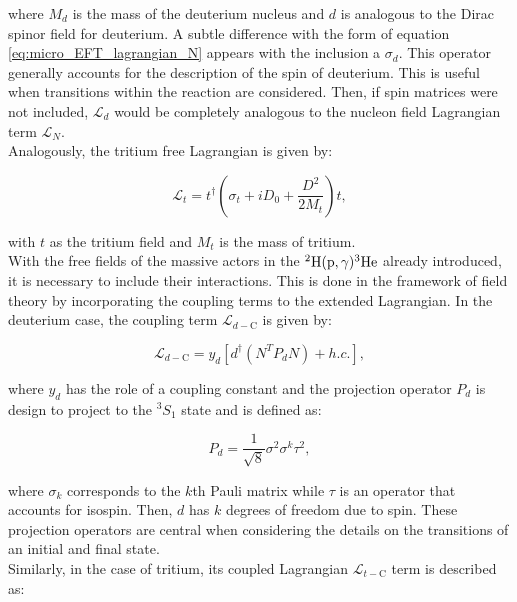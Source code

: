 \documentclass[openany]{book}
\begin{document}
where $M_d$ is the mass of the deuterium nucleus and $d$ is analogous to the Dirac spinor field for deuterium. A subtle difference with the form of equation \ref{eq:micro_EFT_lagrangian_N} appears with the inclusion a $\sigma_d$. This operator generally accounts for the description of the spin of deuterium. This is useful when transitions within the reaction are considered. Then, if spin matrices were not included, $\mathcal{L}_d$ would be completely analogous to the nucleon field Lagrangian term $\mathcal{L}_N$.  \\

Analogously, the tritium free Lagrangian is given by: 

\begin{equation}\label{eq:micro_EFT_lagrangian_t}
	\mathcal{L}_t  = t^{\dagger} \left( \sigma_t + i D_0 + \frac{D^2}{2M_t} \right) t,
\end{equation}

with $t$ as the tritium field and $M_t$ is the mass of tritium.\\

With the free fields of the massive actors in the $\mathrm{{}^{2}H(p, \gamma){}^{3}He}$ already introduced, it is necessary to include their interactions. This is done in the framework of field theory by incorporating the coupling terms to the extended Lagrangian. In the deuterium case, the coupling term $	\mathcal{L}_{d-\mathrm{C}}$ is given by:

 \begin{equation}\label{eq:micro_EFT_lagrangian_d_coupling}
	\mathcal{L}_{d-\mathrm{C}}  = y_d [d^{\dagger} (N^{T} P_d N) + h.c.],
\end{equation}

where $y_d$ has the role of a coupling constant and the projection operator $P_d$ is design to project to the ${}^{3}S_1$ state and is defined as: 

\begin{equation}\label{eq:micro_EFT_Pd}
	P_d = \frac{1}{\sqrt{8}} \sigma^2 \sigma^k \tau^2,
 \end{equation}

where $\sigma_k$ corresponds to the $k$th Pauli matrix while $\tau$ is an operator that accounts for isospin. Then, $d$ has $k$ degrees of freedom due to spin. These projection operators are central when considering the details on the transitions of an initial and final state. \\

Similarly, in the case of tritium, its coupled Lagrangian $\mathcal{L}_{t-\mathrm{C}}$ term is described as: 
\end{document}
